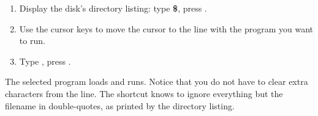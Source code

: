 \begin{enumerate}
\item Display the disk's directory listing: type {\bf \$}, press .
\item Use the cursor keys to move the cursor to the line with the program you want to run.
\item Type {\bf \screentext{$\uparrow$}}, press .
\end{enumerate}

The selected program loads and runs. Notice that you do not have to clear extra characters from the line. The shortcut knows to ignore everything but the filename in double-quotes, as printed by the directory listing.
